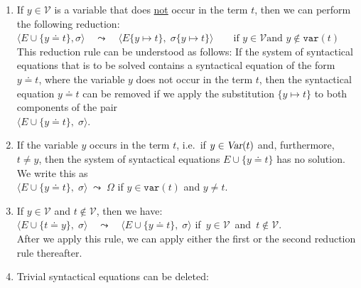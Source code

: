 \begin{enumerate}
\item If  $y\in\mathcal{V}$ is a variable that does  \underline{\color{red}not} occur in the term $t$, then
      we can perform the following reduction:
      \\[0.2cm]
      \hspace*{1.3cm}
      $ \Big\langle E \cup \big\{ y \doteq t \big\}, \sigma \Big\rangle \quad\leadsto\quad 
         \Big\langle E\{y \mapsto t\},\; \sigma\{ y \mapsto t \} \Big\rangle \qquad\mbox{if $y \in \mathcal{V}$
           and $y \not\in \mathtt{var}(t)$}
      $
      \\[0.2cm] 
      This reduction rule can be understood as follows: If the system of syntactical equations that is to be
      solved contains a syntactical equation of the form $y \doteq t$, where the variable $y$ does not occur in
      the term $t$, then the syntactical equation $y \doteq t$ can be removed if we apply the substitution
      $\{ y \mapsto t \}$ to both components of the pair
      \\[0.2cm]
      \hspace*{1.3cm}
      $\Big\langle E \cup \big\{ y \doteq t \big\},\; \sigma \Big\rangle$.
\item If the variable $y$ occurs in the term $t$, i.e.~if  $y \in \textsl{Var}(t)$
      and, furthermore, $t \not= y$, then the system of syntactical equations
      $E \cup \big\{ y \doteq t \big\}$ has no solution.  We write this as
      \\[0.2cm]
      \hspace*{1.3cm}
      $\Big\langle E \cup \big\{ y \doteq t \big\},\; \sigma \Big\rangle\;\leadsto\; \Omega$ \quad
      if $y \in \texttt{var}(t)$ and $y \not=t$.
\item If $y\in\mathcal{V}$ and  $t \not\in \mathcal{V}$, then we have:
      \\[0.2cm]
      \hspace*{1.3cm}
      $\Big\langle E \cup \big\{ t \doteq y \big\},\; \sigma \Big\rangle \quad\leadsto\quad 
      \Big\langle E \cup \big\{ y \doteq t \big\},\; \sigma \Big\rangle$ \qquad
      \mbox{if $y \in \mathcal{V}$ and $t \not\in \mathcal{V}$}.   
      \\[0.2cm]
      After we apply this rule, we can apply either the first or the second reduction rule thereafter.
\item Trivial syntactical equations can be deleted:
      \\[0.2cm]
      \hspace*{1.3cm}

\end{enumerate}
